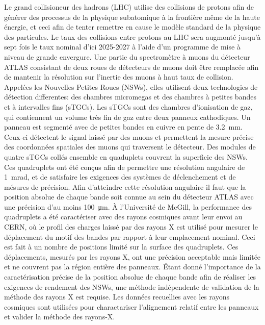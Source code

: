 Le grand collisioneur des hadrons (LHC) utilise des collisions de protons afin de g\'{e}n\'{e}rer des processus de la physique subatomique \`{a} la fronti\`{e}re m\^{e}me de la haute \'{e}nergie, et ceci afin de tenter remettre en cause le mod\`{e}le standard de la physique des particules. Le taux des collisions entre protons au LHC sera augmont\'{e} jusqu'\`{a} sept fois le taux nominal d'ici 2025-2027 \`{a} l'aide d'un programme de mise \`{a} niveau de grande envergure. Une partie du spectrom\`{e}tre \`{a} muons du d\'{e}tecteur ATLAS consistant de deux roues de d\'{e}tecteurs de muons doit \^{e}tre remplac\'{e}e afin de mantenir la r\'{e}solution sur l'inertie des muons \`{a} haut taux de collision. Appel\'{e}es les Nouvelles Petites Roues (NSWs), elles utilisent deux technologies de d\'{e}tection differentes: des chambres micromegas et des chambres \`{a} petites bandes et \`{a} intervalles fins (sTGCs). Les sTGCs sont des chambres d'ionisation de gaz, qui contiennent un volume tr\`{e}s fin de gaz entre deux panneux cathodiques. Un panneau est segment\'{e} avec de petites bandes en cuivre en pente de \SI{3.2}{mm}. Ceux-ci d\'{e}tectent le signal laiss\'{e} par des muons et permettent la mesure pr\'{e}cise des coordonn\'{e}es spatiales des muons qui traversent le d\'{e}tecteur. Des modules de quatre sTGCs coll\'{e}s ensemble en quaduplets couvrent la superficie des NSWs. Ces quadruplets ont \'{e}t\'{e} con\c{c}us afin de permettre une r\'{e}solution angulaire de \SI{1}{mrad}, et de satisfaire les exigences des syst\`{e}mes de d\'{e}clenchement et de m\'{e}sures de pr\'{e}cision. Afin d'atteindre cette r\'{e}solution angulaire il faut que la position absolue de chaque bande soit connue au sein du d\'{e}tecteur ATLAS avec une pr\'{e}cision d'au moins \SI{100}{\micro\meter}. \`{A} l'Universit\'{e} de McGill, la performance des quadruplets a \'{e}t\'{e} caract\'{e}riser avec des rayons cosmiques avant leur envoi au CERN, o\`{u} le profil des charges laiss\'{e} par des rayons X est utilis\'{e} pour mesurer le d\'{e}placement du motif des bandes par rapport \`{a} leur emplacement nominal. Ceci est fait \`{a} un nombre de positions limit\'{e} sur la surface des quadruplets. Ces d\'{e}placements, mesur\'{e}s par les rayons X, ont une pr\'{e}cision acceptable mais limit\'{e}e et ne couvrent pas la r\'{e}gion enti\`{e}re des panneaux. \'{E}tant donn\'{e} l'importance de la caract\'{e}risation pr\'{e}cise de la position absolue de chaque bande afin de r\'{e}aliser les exigences de rendement des NSWs, une m\'{e}thode ind\'{e}pendente de validation de la m\'{e}thode des rayons X est requise. Les donn\'{e}es recuellies avec les rayons cosmiques sont utilis\'{e}es pour charactariser l'alignement relatif entre les panneaux et valider la m\'{e}thode des rayons-X.

